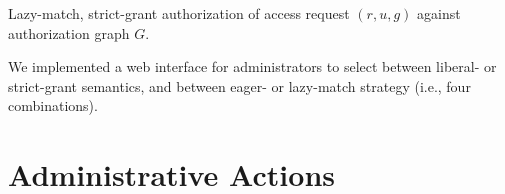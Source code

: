 \documentclass{acm_proc_article-sp}
\begin{document}
\begin{algorithm}[t]
\;
\caption{Lazy-match, strict-grant authorization of access
request $(r, u, g)$ against authorization graph $G$\label{algo-strict}.}
\end{algorithm}

We implemented a web interface for administrators to select between
liberal- or strict-grant semantics, and between eager- or
lazy-match strategy (i.e., four combinations).


\begin{comment}
One may ask why we
keep the eager-match strategy in our implementation. That is because
some of our planned future extensions may work only when the
eager-match strategy is adopted.  One example is that if we are to
incorporate negative permissions and conflict resolution into future
versions, then a lazy-match strategy is not compatible.  We anticipate
that in future versions of our implementation, we will develop code
for selecting the matching strategy based on what access control
features are configured for the system.
\end{comment}

\section{Administrative Actions}
\label{sec-admin}
\end{document}
